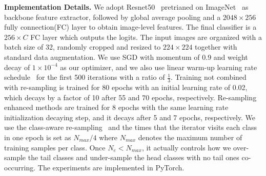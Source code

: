 \documentclass[runningheads]{llncs}
\begin{document}
\noindent\textbf{Implementation Details.}
We adopt Resnet50~\cite{he2016deep} pretrianed on ImageNet~\cite{deng2009imagenet} as backbone feature extractor, followed by global average pooling and a $2048 \times 256$ fully connection(FC) layer to obtain image-level features. The final classifier is a $256 \times C$ FC layer which outputs the logits. 
The input images are organized with a batch size of 32, randomly cropped and resized to $224\times224$ together with standard data augmentation.
We use SGD with momentum of 0.9 and weight decay of $1\times 10^{-4}$ as our optimizer, and we also use linear warm-up learning rate schedule~\cite{goyal2017warmup} for the first 500 iterations with a ratio of $\frac{1}{3}$.
Training not combined with re-sampling is trained for 80 epochs with an initial learning rate of 0.02, which decays by a factor of 10 after 55 and 70 epochs, respectively.
Re-sampling enhanced methods are trained for 8 epochs with the same learning rate initialization decaying step, and it decays after 5 and 7 epochs, respectively.
We use the class-aware re-sampling~\cite{shen2016relay} and the times that the iterator visits each class in one epoch is set as $N_{max}/4$ where $N_{max}$ denotes the maximum number of training samples per class. 
Once $N_e<N_{max}$, it actually controls how we over-sample the tail classes and under-sample the head classes with no tail ones co-occurring. 
The experiments are implemented in PyTorch.
\end{document}
